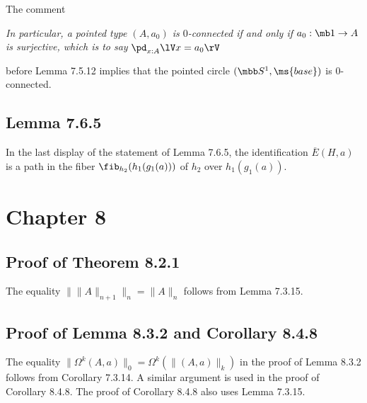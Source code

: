 \documentclass[12pt]{article}
\begin{document}
The comment

\nn\emph{In particular, a pointed type $(A, a_0)$ is $0$-connected if and only if $a_0:\mb1\to A$ is surjective, which is to say} $\pd_{x:A}\lV x= a_0\rV$

\nn before Lemma 7.5.12 implies that the pointed circle $(\mbb S^1,\ms{base})$ is 0-connected.


\subsection{Lemma 7.6.5}

In the last display of the statement of Lemma 7.6.5, the identification $\overline{E}(H,a)$ is a path in the fiber $\fib_{h_2}(h_1(g_1(a)))$ of $h_2$ over $h_1(g_1(a))$.


\section{Chapter 8}




\subsection{Proof of Theorem 8.2.1}

The equality $\lVert\lVert A\rVert_{n+1}\rVert_n=\lVert A\rVert_n$ follows from Lemma 7.3.15.


\subsection{Proof of Lemma 8.3.2 and Corollary 8.4.8}

The equality $\lVert\Omega^k(A,a)\rVert_0=\Omega^k(\lVert(A,a)\rVert_k)$ in the proof of Lemma 8.3.2 follows from Corollary 7.3.14. A similar argument is used in the proof of Corollary 8.4.8. The proof of Corollary 8.4.8 also uses Lemma 7.3.15.

\end{document}
